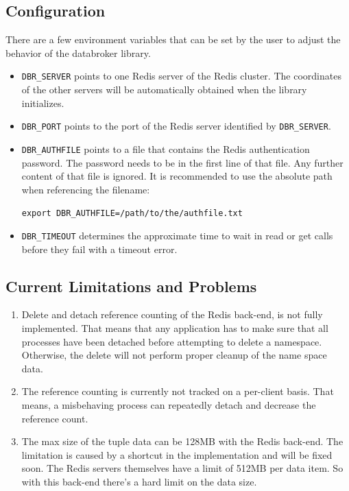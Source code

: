 \subsection{Configuration}
\label{sec:interface:config}
There are a few environment variables that can be set by the user to
adjust the behavior of the databroker library.
\begin{itemize}
\item \texttt{DBR\_SERVER} points to one Redis server of the Redis
  cluster. The coordinates of the other servers will be automatically
  obtained when the library initializes.
\item \texttt{DBR\_PORT} points to the port of the Redis server identified
  by \texttt{DBR\_SERVER}.
\item \texttt{DBR\_AUTHFILE} points to a file that contains the Redis
  authentication password.  The password needs to be in the first line
  of that file. Any further content of that file is ignored. It is
  recommended to use the absolute path when referencing the filename:\\
  \centerline{ \tt export DBR\_AUTHFILE=/path/to/the/authfile.txt}
\item \texttt{DBR\_TIMEOUT} determines the approximate time to wait in
  read or get calls before they fail with a timeout error.
\end{itemize}



\subsection{Current Limitations and Problems}
\label{sec:interface:limits}
\begin{enumerate}
\item Delete and detach reference counting of the Redis back-end, is
  not fully implemented.  That means that any application has to make
  sure that all processes have been detached before attempting to
  delete a namespace. Otherwise, the delete will not perform proper
  cleanup of the name space data.
\item The reference counting is currently not tracked on a per-client
  basis. That means, a misbehaving process can repeatedly detach and
  decrease the reference count.
\item The max size of the tuple data can be 128MB with the Redis
  back-end. The limitation is caused by a shortcut in the
  implementation and will be fixed soon. The Redis servers themselves
  have a limit of 512MB per data item. So with this back-end there's a
  hard limit on the data size.
\end{enumerate}



